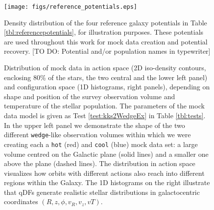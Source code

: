 

\begin{figure}
\texttt{[image: figs/reference\_potentials.eps]}
\caption{Density distribution of the four reference galaxy potentials in Table \ref{tbl:referencepotentials}, for illustration purposes. These potentials are used throughout this work for mock data creation and potential recovery. [TO DO: Potential and/or population names in typewriter]}
\label{fig:ref_pots}
\end{figure}




\begin{figure}
\caption{Distribution of mock data in action space (2D iso-density contours, enclosing 80\% of the stars, the two central and the lower left panel) and configuration space (1D histograms, right panels), depending on shape and position of the survey observation volume and temperature of the stellar population. The parameters of the mock data model is given as Test \ref{test:kks2WedgeEx} in Table \ref{tbl:tests}. In the upper left panel we demonstrate the shape of the two different \texttt{wedge}-like observation volumes within which we were creating each a \texttt{hot} (red) and \texttt{cool} (blue) mock data set: a large volume centred on the Galactic plane (solid lines) and a smaller one above the plane (dashed lines). The distribution in action space visualizes how orbits with different actions also reach into different regions within the Galaxy. The 1D histograms on the right illustrate that qDFs generate realistic stellar distributions in galactocentric coordinates $(R,z,\phi,v_R,v_z,vT)$.  } 
\label{fig:kks2WedgeEx}
\end{figure}



